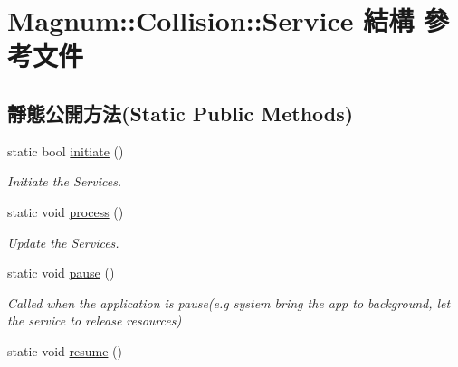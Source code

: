 \hypertarget{struct_magnum_1_1_collision_1_1_service}{}\section{Magnum\+:\+:Collision\+:\+:Service 結構 參考文件}
\label{struct_magnum_1_1_collision_1_1_service}
\subsection*{靜態公開方法(Static Public Methods)}
\begin{DoxyCompactItemize}
\item 
static bool \hyperlink{struct_magnum_1_1_collision_1_1_service_a7e0cf15658cca7dce73643930655295a}{initiate} ()
\begin{DoxyCompactList}\small\item\em Initiate the Services. \end{DoxyCompactList}\item 
static void \hyperlink{struct_magnum_1_1_collision_1_1_service_a7c3de75d56b3189c49b43f9c022fdd94}{process} ()\hypertarget{struct_magnum_1_1_collision_1_1_service_a7c3de75d56b3189c49b43f9c022fdd94}{}\label{struct_magnum_1_1_collision_1_1_service_a7c3de75d56b3189c49b43f9c022fdd94}

\begin{DoxyCompactList}\small\item\em Update the Services. \end{DoxyCompactList}\item 
static void \hyperlink{struct_magnum_1_1_collision_1_1_service_ad5be58e933712d3ce52f95866104890f}{pause} ()\hypertarget{struct_magnum_1_1_collision_1_1_service_ad5be58e933712d3ce52f95866104890f}{}\label{struct_magnum_1_1_collision_1_1_service_ad5be58e933712d3ce52f95866104890f}

\begin{DoxyCompactList}\small\item\em Called when the application is pause(e.\+g system bring the app to background, let the service to release resources) \end{DoxyCompactList}\item 
static void \hyperlink{struct_magnum_1_1_collision_1_1_service_a76cf143b5816755474d6a960b22d39e7}{resume} ()\hypertarget{struct_magnum_1_1_collision_1_1_service_a76cf143b5816755474d6a960b22d39e7}{}\label{struct_magnum_1_1_collision_1_1_service_a76cf143b5816755474d6a960b22d39e7}


\end{DoxyCompactItemize}
